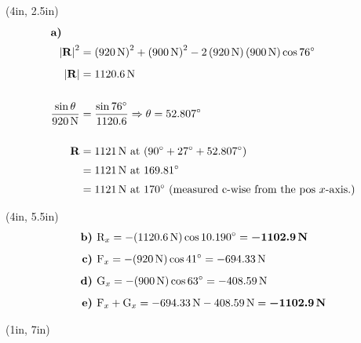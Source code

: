 \documentclass[10pt,oneside]{article}
\begin{document}
\begin{textblock*}{3.25in}(4in, 2.5in)
	\large
	\begin{align*}
		\intertext{\bf a)}\vspace{-0.5cm}
		\left|\bm{\mathrm R}\right|^2 &= \left(920\,\text{N}\right)^2+\left(900\,\text{N}\right)^2-2\left(920\,\text{N}\right)\left(900\,\text{N}\right)\cos 76\deg\\[0.5em]
		 \left|\bm{\mathrm R}\right| &= 1120.6\,\text{N}\\\\
		 \frac{\sin\theta}{920\,\text{N}} &= \frac{\sin 76\deg}{1120.6}\Rightarrow \theta = 52.807\deg\\\\
		 \bm{\mathrm R} &= 1121\,\text{N at } (90\deg+27\deg+52.807\deg) \\[0.25em]
		 &= 1121\,\text{N at }169.81\deg \\[0.25em]
		 &= 1121\,\text{N at }170\deg \text{ (measured c-wise from the pos }x\text{-axis.)}
	\end{align*}
\end{textblock*}

\begin{textblock*}{3.25in}(4in, 5.5in)
	\large
	\begin{align*}
		\text{\bf b) } &\mathrm{R}_x =-(1120.6\,\text{N})\cos 10.190^\circ = \bm{-1102.9\,\text{\bf N}}\\[0.5em]
		\text{\bf c) } &\mathrm{F}_x = -(920\,\text{N})\cos 41^\circ =		-694.33\,\text{N} \\[0.5em]
		\text{\bf d) } &\mathrm{G}_x = -(900\,\text{N})\cos 63^\circ =		-408.59\,\text{N} \\[0.5em]
		\text{\bf e) } &\mathrm{F}_x+\mathrm{G}_x = -694.33\,\text{N} -408.59\,\text{N} 
			=\bm{-1102.9\,\text{\bf N}} 
	\end{align*}
\end{textblock*}

\begin{textblock*}{2.25in}(1in, 7in)
\end{textblock*}
\end{document}
